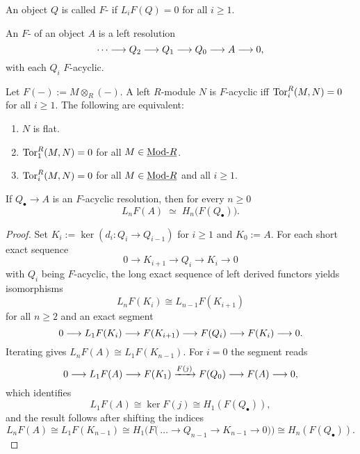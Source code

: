 \begin{definition*}
	An object \( Q \) is called \( F \)- if \( L_iF(Q)=0 \) for all \( i\ge 1 \).
\end{definition*}

\begin{definition*}
	An \( F \)- of an object \( A \) is a left resolution
	\[
		\dotsm \longrightarrow Q_2 \longrightarrow Q_1 \longrightarrow Q_0 \longrightarrow A \longrightarrow 0,
	\]
	with each \( Q_i \) \( F \)-acyclic.
\end{definition*}

\begin{example*}
	Let \( F(-):= M\otimes_R(-) \). A left \( R \)-module \( N \) is \( F \)-acyclic iff \( \operatorname{Tor}_i^R(M,N)=0 \) for all \( i\ge 1 \). The following are equivalent:
	\begin{enumerate}
		\item \( N \) is flat.
		\item \( \operatorname{Tor}_1^R(M,N)=0 \) for all \( M\in \underline{\mathrm{Mod}\text{-}R} \).
		\item \( \operatorname{Tor}_i^R(M,N)=0 \) for all \( M\in \underline{\mathrm{Mod}\text{-}R} \) and all \( i\ge 1 \).
	\end{enumerate}
\end{example*}

\begin{proposition*}
	If \( Q_\bullet \to A \) is an \( F \)-acyclic resolution, then for every \( n\ge 0 \)
	\[
		L_n F(A)\;\simeq\; H_n\bigl(F(Q_\bullet)\bigr).
	\]
\end{proposition*}

\begin{proof}
	Set \( K_i := \ker(d_i: Q_i\to Q_{i-1}) \) for \( i\ge 1 \) and \( K_0:=A \). For each short exact sequence
	\[
		0\to K_{i+1}\to Q_i\to K_i\to 0
	\]
	with \( Q_i \) being \( F \)-acyclic, the long exact sequence of left derived functors yields isomorphisms
	\[
		L_nF(K_i)\cong L_{n-1}F(K_{i+1})
	\]
	for all \( n\ge 2 \) and an exact segment
	\[
		0\longrightarrow L_1F(K_i)\longrightarrow F(K_{i+1}) \longrightarrow F(Q_i)\longrightarrow F(K_i)\longrightarrow 0.
	\]
	Iterating gives \( L_nF(A)\cong L_1F(K_{n-1}) \). For \( i=0 \) the segment reads
	\[
		0\longrightarrow L_1F(A)\longrightarrow F(K_1)\xrightarrow{F(j)} F(Q_0)\longrightarrow F(A)\longrightarrow 0,
	\]
	which identifies
	\[
		L_1F(A) \cong \ker F(j) \cong H_1(F(Q_\bullet)),
	\]
	and the result follows after shifting the indices
	\[
		L_n F(A) \cong L_1 F(K_{n - 1}) \cong H_1\biggl(F\bigl(\,\dotsc \to Q_{n - 1} \to K_{n - 1} \to 0\bigr)\biggr) \cong H_n (F(Q_\bullet)).
	\]
\end{proof}

